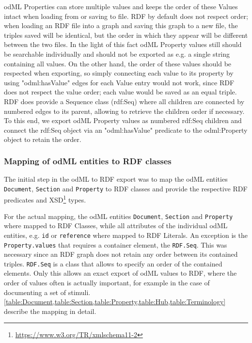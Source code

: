 \documentclass{article}
\begin{document}
odML Properties can store multiple values and keeps the order of these Values intact when loading from or saving to file. RDF by default does not respect order; when loading an RDF file into a graph and saving this graph to a new file, the triples saved will be identical, but the order in which they appear will be different between the two files.
In the light of this fact odML Property values still should be searchable individually and should not be exported as e.g. a single string containing all values. On the other hand, the order of these values should be respected when exporting, so simply connecting each value to its property by using "odml:hasValue" edges for each Value entry would not work, since RDF does not respect the value order; each value would be saved as an equal triple.
RDF does provide a Sequence class (rdf:Seq) where all children are connected by numbered edges to its parent, allowing to retrieve the children order if necessary. To this end, we export odML Property values as numbered rdf:Seq children and connect the rdf:Seq object via an "odml:hasValue" predicate to the odml:Property object to retain the order.

\subsubsection{Mapping of odML entities to RDF classes} \label{sec:odml_rdf_mapping}

The initial step in the odML to RDF export was to map the odML entities \texttt{Document}, \texttt{Section} and \texttt{Property} to RDF classes and provide the respective RDF predicates and XSD\footnote{\url{https://www.w3.org/TR/xmlschema11-2}} types.

For the actual mapping, the odML entities \texttt{Document}, \texttt{Section} and \texttt{Property} where mapped to RDF Classes, while all attributes of the individual odML entities, e.g. \texttt{id} or \texttt{reference} where mapped to RDF Literals. An exception is the \texttt{Property.values} that requires a container element, the \texttt{RDF.Seq}. This was necessary since an RDF graph does not retain any order between its contained triples. \texttt{RDF.Seq} is a class that allows to specify an order of the contained elements. Only this allows an exact export of odML values to RDF, where the order of values often is actually important, for example in the case of documenting a set of stimuli. \cref{table:Document,table:Section,table:Property,table:Hub,table:Terminology} describe the mapping in detail.
\end{document}

